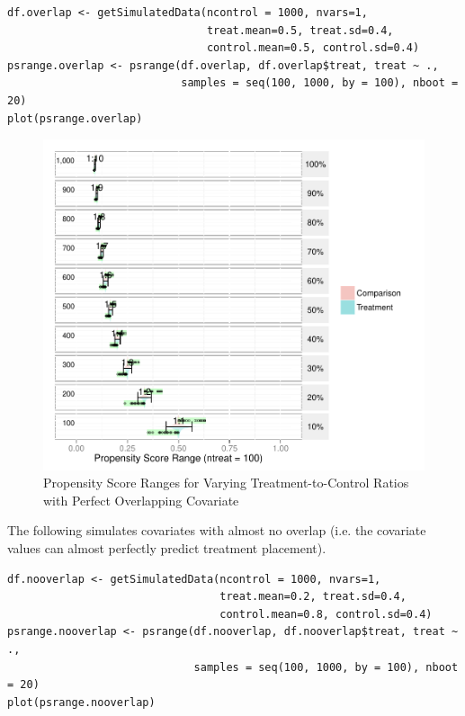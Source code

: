 \begin{singlespace}
\begin{verbatim}
df.overlap <- getSimulatedData(ncontrol = 1000, nvars=1,
                               treat.mean=0.5, treat.sd=0.4,
                               control.mean=0.5, control.sd=0.4)
psrange.overlap <- psrange(df.overlap, df.overlap$treat, treat ~ ., 
                           samples = seq(100, 1000, by = 100), nboot = 20)
plot(psrange.overlap)
\end{verbatim}

\begin{figure}[h!]
\begin{center}
\includegraphics[width=\textwidth]{../Figures2009/PSRanges-Overlap.pdf}
\caption{Propensity Score Ranges for Varying Treatment-to-Control Ratios with Perfect Overlapping Covariate}
\end{center}
\end{figure}

\noindent The following simulates covariates with almost no overlap (i.e. the covariate values can almost perfectly predict treatment placement).

\begin{verbatim}
df.nooverlap <- getSimulatedData(ncontrol = 1000, nvars=1,
                                 treat.mean=0.2, treat.sd=0.4,
                                 control.mean=0.8, control.sd=0.4)
psrange.nooverlap <- psrange(df.nooverlap, df.nooverlap$treat, treat ~ ., 
                             samples = seq(100, 1000, by = 100), nboot = 20)
plot(psrange.nooverlap)
\end{verbatim}


\end{singlespace}
